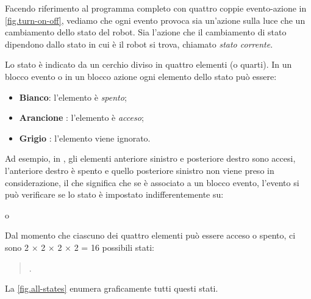 Facendo riferimento al programma completo con quattro coppie evento-azione
in \cref{fig.turn-on-off}, vediamo che
ogni evento provoca sia un'azione sulla luce che un cambiamento dello stato
del robot. Sia l'azione che il cambiamento di stato dipendono dallo stato in cui è il robot si trova, chiamato \emph{stato corrente}.

\newpage


Lo stato è indicato da un cerchio diviso in quattro elementi (o quarti).
In un  blocco evento o in un blocco azione ogni elemento dello stato può essere:
\begin{itemize}
\item \textbf{Bianco}: l'elemento è \emph{spento};
\item \textbf{Arancione} : l'elemento è \emph{acceso};
\item \textbf{Grigio} : l'elemento viene ignorato.
\end{itemize}

Ad esempio, in , gli elementi anteriore sinistro e posteriore destro sono accesi, l'anteriore destro è spento e quello posteriore sinistro non viene preso in considerazione,
il che significa che se  è associato a un blocco evento, l'evento si può verificare se lo stato è impostato indifferentemente su:
\begin{center}
\centering {}\quad o \quad {}
\end{center}

Dal momento che ciascuno dei quattro elementi può essere acceso o spento, ci sono 2 $\times$ 2 $\times$ 2 $\times$ 2  = 16 possibili stati:
\begin{quote}
.
\end{quote}
La \cref{fig.all-states} enumera graficamente tutti questi stati.


